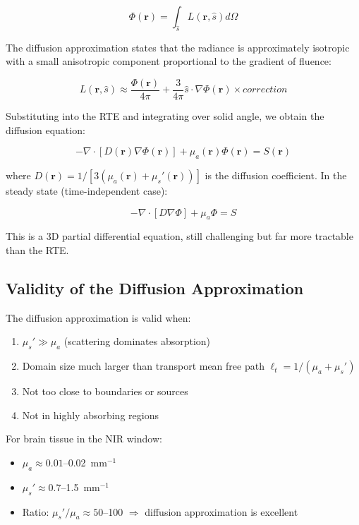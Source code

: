 \documentclass[12pt]{article}
\def\text#1{#1}%
\def\,{ }%
\begin{document}
\begin{equation}
\Phi(\mathbf{r}) = \int_{\hat{s}} L(\mathbf{r}, \hat{s}) \, d\Omega
\end{equation}

The diffusion approximation states that the radiance is approximately isotropic with a small anisotropic component proportional to the gradient of fluence:

\begin{equation}
L(\mathbf{r}, \hat{s}) \approx \frac{\Phi(\mathbf{r})}{4\pi} + \frac{3}{4\pi} \hat{s} \cdot \nabla\Phi(\mathbf{r}) \times \text{correction}
\end{equation}

Substituting into the RTE and integrating over solid angle, we obtain the diffusion equation:

\begin{equation}
-\nabla \cdot [D(\mathbf{r}) \nabla\Phi(\mathbf{r})] + \mu_a(\mathbf{r}) \Phi(\mathbf{r}) = S(\mathbf{r})
\label{eq:diffusion}
\end{equation}

where $D(\mathbf{r}) = 1 / [3(\mu_a(\mathbf{r}) + \mu_s'(\mathbf{r}))]$ is the diffusion coefficient. In the steady state (time-independent case):

\begin{equation}
-\nabla \cdot [D \nabla\Phi] + \mu_a \Phi = S
\end{equation}

This is a 3D partial differential equation, still challenging but far more tractable than the RTE.

\subsection{Validity of the Diffusion Approximation}

The diffusion approximation is valid when:

\begin{enumerate}
\item $\mu_s' \gg \mu_a$ (scattering dominates absorption)
\item Domain size much larger than transport mean free path $\ell_t = 1/(\mu_a + \mu_s')$
\item Not too close to boundaries or sources
\item Not in highly absorbing regions
\end{enumerate}

For brain tissue in the NIR window:
\begin{itemize}
\item $\mu_a \approx 0.01$--0.02~mm$^{-1}$
\item $\mu_s' \approx 0.7$--1.5~mm$^{-1}$
\item Ratio: $\mu_s' / \mu_a \approx 50$--100 \quad $\Rightarrow$ \quad diffusion approximation is excellent
\end{itemize}
\end{document}
